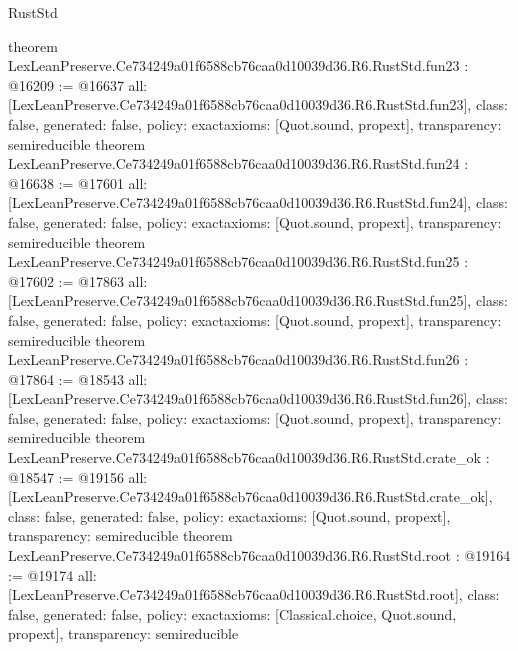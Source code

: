 \begin{lexlean}{RustStd}
\begin{coremodule}
{}
theorem LexLeanPreserve.Ce734249a01f6588cb76caa0d10039d36.R6.RustStd.fun23 : @16209 := @16637 {
  all: [LexLeanPreserve.Ce734249a01f6588cb76caa0d10039d36.R6.RustStd.fun23],
  class: false,
  generated: false,
  policy: exact{axioms: [Quot.sound, propext]},
  transparency: semireducible
}
theorem LexLeanPreserve.Ce734249a01f6588cb76caa0d10039d36.R6.RustStd.fun24 : @16638 := @17601 {
  all: [LexLeanPreserve.Ce734249a01f6588cb76caa0d10039d36.R6.RustStd.fun24],
  class: false,
  generated: false,
  policy: exact{axioms: [Quot.sound, propext]},
  transparency: semireducible
}
theorem LexLeanPreserve.Ce734249a01f6588cb76caa0d10039d36.R6.RustStd.fun25 : @17602 := @17863 {
  all: [LexLeanPreserve.Ce734249a01f6588cb76caa0d10039d36.R6.RustStd.fun25],
  class: false,
  generated: false,
  policy: exact{axioms: [Quot.sound, propext]},
  transparency: semireducible
}
theorem LexLeanPreserve.Ce734249a01f6588cb76caa0d10039d36.R6.RustStd.fun26 : @17864 := @18543 {
  all: [LexLeanPreserve.Ce734249a01f6588cb76caa0d10039d36.R6.RustStd.fun26],
  class: false,
  generated: false,
  policy: exact{axioms: [Quot.sound, propext]},
  transparency: semireducible
}
theorem LexLeanPreserve.Ce734249a01f6588cb76caa0d10039d36.R6.RustStd.crate_ok : @18547 := @19156 {
  all: [LexLeanPreserve.Ce734249a01f6588cb76caa0d10039d36.R6.RustStd.crate_ok],
  class: false,
  generated: false,
  policy: exact{axioms: [Quot.sound, propext]},
  transparency: semireducible
}
theorem LexLeanPreserve.Ce734249a01f6588cb76caa0d10039d36.R6.RustStd.root : @19164 := @19174 {
  all: [LexLeanPreserve.Ce734249a01f6588cb76caa0d10039d36.R6.RustStd.root],
  class: false,
  generated: false,
  policy: exact{axioms: [Classical.choice, Quot.sound, propext]},
  transparency: semireducible
}


\end{coremodule}
\end{lexlean}
